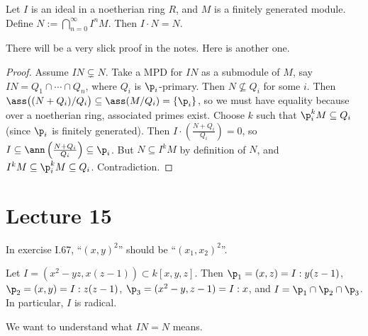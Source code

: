  \begin{theorem}
   Let $I$ is an ideal in a noetherian ring $R$, and $M$ is a finitely generated module.
   Define $N:= \bigcap_{n=0}^\infty I^n M$. Then $I\cdot N=N$.
 \end{theorem}
 There will be a very slick proof in the notes. Here is another one.
 \begin{proof}
   Assume $IN\subsetneq N$. Take a MPD for $IN$ as a submodule of $M$, say $IN=Q_1\cap
   \cdots \cap Q_n$, where $Q_i$ is $\p_i$-primary. Then $N\not\subseteq Q_i$ for some
   $i$. Then $\ass\bigl( (N+Q_i)/Q_i\bigr)\subseteq \ass(M/Q_i)=\{\p_i\}$, so we must
   have equality because over a noetherian ring, associated primes exist. Choose $k$ such
   that $\p_i^k M\subseteq Q_i$ (since $\p_i$ is finitely generated). Then $I\cdot
   \left(\frac{N+Q_i}{Q_i}\right)=0$, so $I\subseteq \ann
   \left(\frac{N+Q_i}{Q_i}\right)\subseteq \p_i$. But $N\subseteq I^k M$ by definition of
   $N$, and $I^k M\subseteq \p_i^k M \subseteq Q_i$. Contradiction.
 \end{proof}
 \setcounter{lecture}{15}
 \section{Lecture 15}

 In exercise I.67, ``$(x,y)^2$'' should be ``$(x_1,x_2)^2$''.

 \begin{example}
   Let $I=(x^2-yz, x(z-1))\subset k[x,y,z]$. Then $\p_1=(x,z)=I:y(z-1)$, $\p_2=(x,y)=I:z(z-1)$,
   $\p_3=(x^2-y,z-1)=I:x$, and $I=\p_1\cap\p_2\cap\p_3$. In particular, $I$ is radical.
 \end{example}

 We want to understand what $IN=N$ means.

